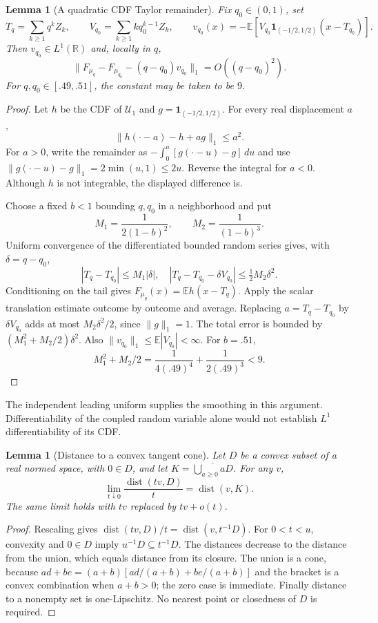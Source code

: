 \documentclass[11pt,letterpaper]{article}
\newtheorem{lemma}[theorem]{Lemma}
\theoremstyle{remark}\newtheorem{remark}[theorem]{Remark}
\newcommand{\R}{\mathbb R}\newcommand{\E}{\mathbb E}
\newcommand{\Un}{\mathcal U}\newcommand{\Law}{\mathcal L}
\newcommand{\dist}{\operatorname{dist}}
\begin{document}
\begin{lemma}[A quadratic CDF Taylor remainder]\label{lem:taylor}
Fix $q_0\in(0,1)$, set
\[
T_q=\sum_{k\ge1}q^kZ_k,\qquad
V_{q_0}=\sum_{k\ge1}kq_0^{k-1}Z_k,\qquad
v_{q_0}(x)=-\E[V_{q_0}\mathbf1_{(-1/2,1/2)}(x-T_{q_0})].
\]
Then $v_{q_0}\in L^1(\R)$ and, locally in $q$,
\[
\|F_{\mu_q}-F_{\mu_{q_0}}-(q-q_0)v_{q_0}\|_1=O((q-q_0)^2).
\]
For $q,q_0\in[.49,.51]$, the constant may be taken to be $9$.
\end{lemma}
\begin{proof}
Let $h$ be the CDF of $\Un_1$ and $g=\mathbf1_{(-1/2,1/2)}$. For every real displacement $a$,
\[
\|h(\cdot-a)-h+ag\|_1\le a^2.
\]
For $a>0$, write the remainder as $-\int_0^a[g(\cdot-u)-g]\,du$ and use $\|g(\cdot-u)-g\|_1=2\min(u,1)\le2u$. Reverse the integral for $a<0$. Although $h$ is not integrable, the displayed difference is.

Choose a fixed $b<1$ bounding $q,q_0$ in a neighborhood and put
\[
M_1=\frac1{2(1-b)^2},\qquad M_2=\frac1{(1-b)^3}.
\]
Uniform convergence of the differentiated bounded random series gives, with $\delta=q-q_0$,
\[
|T_q-T_{q_0}|\le M_1|\delta|,
\quad |T_q-T_{q_0}-\delta V_{q_0}|\le\tfrac12M_2\delta^2.
\]
Conditioning on the tail gives $F_{\mu_q}(x)=\E h(x-T_q)$. Apply the scalar translation estimate outcome by outcome and average. Replacing $a=T_q-T_{q_0}$ by $\delta V_{q_0}$ adds at most $M_2\delta^2/2$, since $\|g\|_1=1$. The total error is bounded by $(M_1^2+M_2/2)\delta^2$. Also $\|v_{q_0}\|_1\le\E|V_{q_0}|<\infty$. For $b=.51$,
\[
M_1^2+M_2/2=\frac1{4(.49)^4}+\frac1{2(.49)^3}<9.
\]
\end{proof}

The independent leading uniform supplies the smoothing in this argument. Differentiability of the coupled random variable alone would not establish $L^1$ differentiability of its CDF.

\begin{lemma}[Distance to a convex tangent cone]\label{lem:cone}
Let $D$ be a convex subset of a real normed space, with $0\in D$, and let
$K=\overline{\bigcup_{a\ge0}aD}$. For any $v$,
\[
\lim_{t\downarrow0}\frac{\dist(tv,D)}t=\dist(v,K).
\]
The same limit holds with $tv$ replaced by $tv+o(t)$.
\end{lemma}
\begin{proof}
Rescaling gives $\dist(tv,D)/t=\dist(v,t^{-1}D)$. For $0<t<u$, convexity and $0\in D$ imply $u^{-1}D\subseteq t^{-1}D$. The distances decrease to the distance from the union, which equals distance from its closure. The union is a cone, because $ad+be=(a+b)[ad/(a+b)+be/(a+b)]$ and the bracket is a convex combination when $a+b>0$; the zero case is immediate. Finally distance to a nonempty set is one-Lipschitz. No nearest point or closedness of $D$ is required.
\end{proof}
\end{document}
